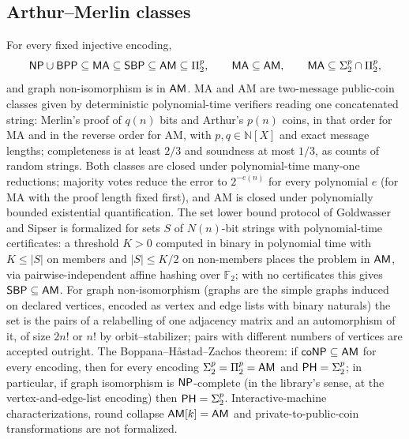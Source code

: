 \begin{result}
\subsection{Arthur--Merlin classes}
For every fixed injective encoding,
\[
\mathsf{NP}\cup\mathsf{BPP}\subseteq\mathsf{MA}\subseteq\mathsf{SBP}\subseteq\mathsf{AM}\subseteq\Pi^p_2,\qquad
\mathsf{MA}\subseteq\mathsf{AM},\qquad \mathsf{MA}\subseteq\Sigma^p_2\cap\Pi^p_2,
\]
and graph non-isomorphism is in $\mathsf{AM}$. MA and AM are two-message public-coin classes given by
deterministic polynomial-time verifiers reading one concatenated string: Merlin's proof of $q(n)$
bits and Arthur's $p(n)$ coins, in that order for MA and in the reverse order for AM, with
$p,q\in\mathbb{N}[X]$ and exact message lengths; completeness is at least $2/3$ and soundness at
most $1/3$, as counts of random strings. Both classes are closed under polynomial-time many-one
reductions; majority votes reduce the error to $2^{-e(n)}$ for every polynomial $e$ (for MA with
the proof length fixed first), and AM is closed under polynomially bounded existential
quantification. The set lower bound protocol of Goldwasser and Sipser is formalized for sets $S$ of
$N(n)$-bit strings with polynomial-time certificates: a threshold $K>0$ computed in binary in
polynomial time with $K\le|S|$ on members and $|S|\le K/2$ on non-members places the problem in
$\mathsf{AM}$, via pairwise-independent affine hashing over $\mathbb{F}_2$; with no certificates this
gives $\mathsf{SBP}\subseteq\mathsf{AM}$. For graph non-isomorphism (graphs are the simple graphs induced on
declared vertices, encoded as vertex and edge lists with binary naturals) the set is the pairs of a
relabelling of one adjacency matrix and an automorphism of it, of size $2n!$ or $n!$ by
orbit--stabilizer; pairs with different numbers of vertices are accepted outright. The
Boppana--H{\aa}stad--Zachos theorem: if $\mathsf{coNP}\subseteq\mathsf{AM}$ for every encoding, then for
every encoding $\Sigma^p_2=\Pi^p_2=\mathsf{AM}$ and $\mathsf{PH}=\Sigma^p_2$; in particular, if graph
isomorphism is $\mathsf{NP}$-complete (in the library's sense, at the vertex-and-edge-list encoding)
then $\mathsf{PH}=\Sigma^p_2$. Interactive-machine characterizations, round collapse
$\mathsf{AM}[k]=\mathsf{AM}$ and private-to-public-coin transformations are not formalized.
\citep{Babai1985,BabaiMoran1988,GoldwasserSipser1986,BoehlerGlasserMeister2006,BoppanaHastadZachos1987}\citep[Section 8.2]{AroraBarak09}

\end{result}
